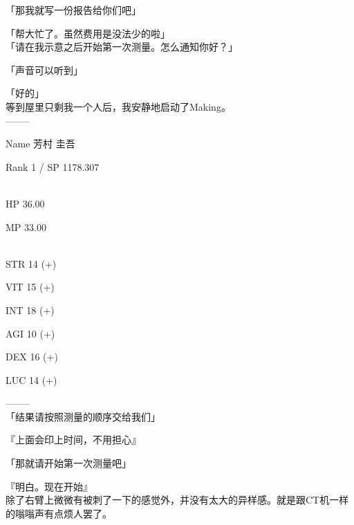 「那我就写一份报告给你们吧」

「帮大忙了。虽然费用是没法少的啦」\\

「请在我示意之后开始第一次测量。怎么通知你好？」

「声音可以听到」

「好的」\\

等到屋里只剩我一个人后，我安静地启动了Making。\\

  --------

  Name 芳村 圭吾

  Rank 1 / SP 1178.307

%  
\\

  HP  36.00

  MP  33.00

%  
\\

  STR 14 (+)

  VIT 15 (+)

  INT 18 (+)

  AGI 10 (+)

  DEX 16 (+)

  LUC 14 (+)

  --------\\

「结果请按照测量的顺序交给我们」

『上面会印上时间，不用担心』

「那就请开始第一次测量吧」

『明白。现在开始』\\

除了右臂上微微有被刺了一下的感觉外，并没有太大的异样感。就是跟CT机一样的嗡嗡声有点烦人罢了。

